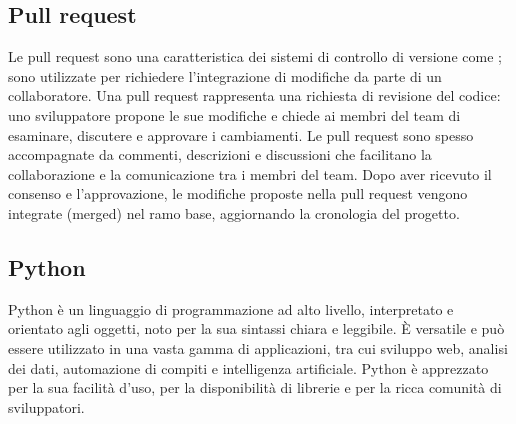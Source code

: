 \vspace{2em}
\subsection*{Pull request}
\par Le pull request sono una caratteristica dei sistemi di controllo di versione come ; sono utilizzate per richiedere l'integrazione di modifiche da parte di un collaboratore. Una pull request rappresenta una richiesta di revisione del codice: uno sviluppatore propone le sue modifiche e chiede ai membri del team di esaminare, discutere e approvare i cambiamenti. Le pull request sono spesso accompagnate da commenti, descrizioni e discussioni che facilitano la collaborazione e la comunicazione tra i membri del team. Dopo aver ricevuto il consenso e l'approvazione, le modifiche proposte nella pull request vengono integrate (merged) nel ramo base, aggiornando la cronologia del progetto.

\vspace{2em}
\subsection*{Python}
\par Python è un linguaggio di programmazione ad alto livello, interpretato e orientato agli oggetti, noto per la sua sintassi chiara e leggibile. È versatile e può essere utilizzato in una vasta gamma di applicazioni, tra cui sviluppo web, analisi dei dati, automazione di compiti e intelligenza artificiale. Python è apprezzato per la sua facilità d'uso, per la disponibilità di librerie e per la ricca comunità di sviluppatori.
